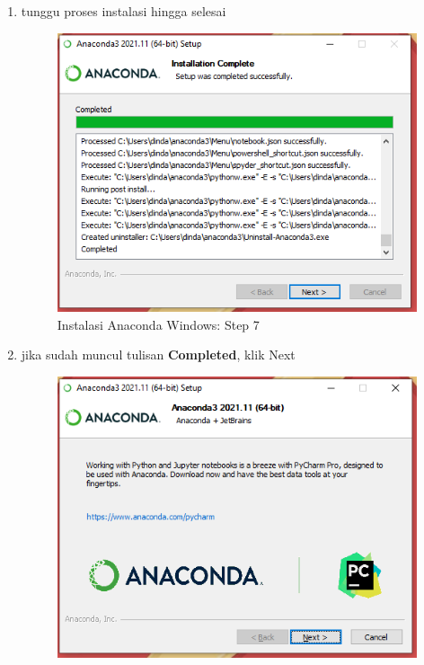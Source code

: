 \begin{enumerate}
\begin{figure}[H]
        \label{instalanacondawindowsstep6}
\end{figure}
\item tunggu proses instalasi hingga selesai
\begin{figure}[H]
        \centerline{\includegraphics[scale=0.75]{figures/instalasi-anaconda-windows/step7}}
        \caption{Instalasi Anaconda Windows: Step 7}
\end{figure}
\item jika sudah muncul tulisan \textbf{Completed}, klik Next
\begin{figure}[H]
        \centerline{\includegraphics[scale=0.75]{figures/instalasi-anaconda-windows/step8}}

\end{figure}
\end{enumerate}
